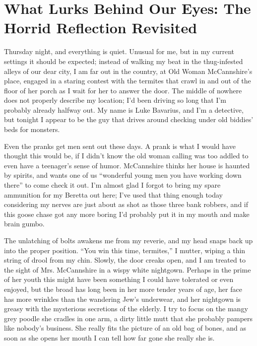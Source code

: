 \chapter[What Lurks Behind Our Eyes]{What Lurks Behind Our Eyes: The Horrid Reflection Revisited}





Thursday night, and everything is quiet. Unusual for me, but in my
current settings it should be expected; instead of walking my beat
in the thug-infested alleys of our dear city, I am far out in the
country, at Old Woman McCannshire's place, engaged in a staring
contest with the termites that crawl in and out of the floor of her
porch as I wait for her to answer the door. The middle of nowhere
does not properly describe my location; I'd been driving so long
that I'm probably already halfway out. My name is Luke Bavarius,
and I'm a detective, but tonight I appear to be the guy that drives
around checking under old biddies' beds for monsters.



Even the pranks get men sent out these days. A prank is what I
would have thought this would be, if I didn't know the old woman
calling was too addled to even have a teenager's sense of humor.
McCannshire thinks her house is haunted by spirits, and wants one
of us ``wonderful young men you have working down there'' to come
check it out. I'm almost glad I forgot to bring my spare ammunition
for my Beretta out here; I've used that thing enough today
considering my nerves are just about as shot as those three bank
robbers, and if this goose chase got any more boring I'd probably
put it in my mouth and make brain gumbo.



The unlatching of bolts awakens me from my reverie, and my head
snaps back up into the proper position. ``You win this time,
termites,'' I mutter, wiping a thin string of drool from my chin.
Slowly, the door creaks open, and I am treated to the sight of Mrs.
McCannshire in a wispy white nightgown. Perhaps in the prime of her
youth this might have been something I could have tolerated or even
enjoyed, but the broad has long been in her more tender years of
age, her face has more wrinkles than the wandering Jew's underwear,
and her nightgown is greasy with the mysterious secretions of the
elderly. I try to focus on the mangy grey poodle she cradles in one
arm, a dirty little mutt that she probably pampers like nobody's
business. She really fits the picture of an old bag of bones, and
as soon as she opens her mouth I can tell how far gone she really
she is.



